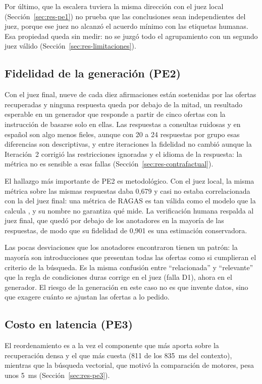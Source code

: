 Por último, que la escalera tuviera la misma dirección con el juez local (Sección~\ref{sec:res-pe1}) no prueba que las conclusiones sean independientes del juez, porque ese juez no alcanzó el acuerdo mínimo con las etiquetas humanas. Esa propiedad queda sin medir: no se juzgó todo el agrupamiento con un segundo juez válido (Sección~\ref{sec:res-limitaciones}).

\subsection{Fidelidad de la generación (PE2)}

Con el juez final, nueve de cada diez afirmaciones están sostenidas por las ofertas recuperadas y ninguna respuesta queda por debajo de la mitad, un resultado esperable en un generador que responde a partir de cinco ofertas con la instrucción de basarse solo en ellas. Las respuestas a consultas ruidosas y en español son algo menos fieles, aunque con 20 a 24 respuestas por grupo esas diferencias son descriptivas, y entre iteraciones la fidelidad no cambió aunque la Iteración~2 corrigió las restricciones ignoradas y el idioma de la respuesta: la métrica no es sensible a esas fallas (Sección~\ref{sec:res-contrafactual}).

El hallazgo más importante de PE2 es metodológico. Con el juez local, la misma métrica sobre las mismas respuestas daba 0,679 y casi no estaba correlacionada con la del juez final: una métrica de RAGAS es tan válida como el modelo que la calcula \citep{Es2024}, y su nombre no garantiza qué mide. La verificación humana respalda al juez final, que quedó por debajo de los anotadores en la mayoría de las respuestas, de modo que su fidelidad de 0,901 es una estimación conservadora.

Las pocas desviaciones que los anotadores encontraron tienen un patrón: la mayoría son introducciones que presentan todas las ofertas como si cumplieran el criterio de la búsqueda. Es la misma confusión entre \enquote{relacionada} y \enquote{relevante} que la regla de condiciones duras corrige en el juez (falla D1), ahora en el generador. El riesgo de la generación en este caso no es que invente datos, sino que exagere cuánto se ajustan las ofertas a lo pedido.

\subsection{Costo en latencia (PE3)}

El reordenamiento es a la vez el componente que más aporta sobre la recuperación densa y el que más cuesta (811 de los 835~ms del contexto), mientras que la búsqueda vectorial, que motivó la comparación de motores, pesa unos 5~ms (Sección~\ref{sec:res-pe3}).

